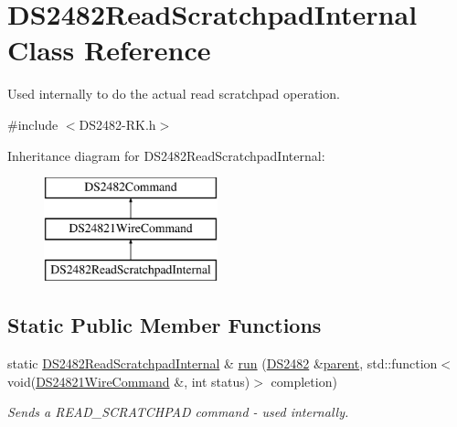 \hypertarget{class_d_s2482_read_scratchpad_internal}{}\section{D\+S2482\+Read\+Scratchpad\+Internal Class Reference}
\label{class_d_s2482_read_scratchpad_internal}


Used internally to do the actual read scratchpad operation.  




{\ttfamily \#include $<$D\+S2482-\/\+R\+K.\+h$>$}

Inheritance diagram for D\+S2482\+Read\+Scratchpad\+Internal\+:\begin{figure}[H]
\begin{center}
\leavevmode
\includegraphics[height=3.000000cm]{class_d_s2482_read_scratchpad_internal}
\end{center}
\end{figure}
\subsection*{Static Public Member Functions}
\begin{DoxyCompactItemize}
\item 
\mbox{\label{class_d_s2482_read_scratchpad_internal_a222c1ac367ecdbecb671c99796a4fa26}} 
static \mbox{\hyperlink{class_d_s2482_read_scratchpad_internal}{D\+S2482\+Read\+Scratchpad\+Internal}} \& \mbox{\hyperlink{class_d_s2482_read_scratchpad_internal_a222c1ac367ecdbecb671c99796a4fa26}{run}} (\mbox{\hyperlink{class_d_s2482}{D\+S2482}} \&\mbox{\hyperlink{class_d_s2482_command_a54a41fb8a610ef2077f5e5377771aaf3}{parent}}, std\+::function$<$ void(\mbox{\hyperlink{class_d_s24821_wire_command}{D\+S24821\+Wire\+Command}} \&, int status)$>$ completion)
\begin{DoxyCompactList}\small\item\em Sends a R\+E\+A\+D\+\_\+\+S\+C\+R\+A\+T\+C\+H\+P\+AD command -\/ used internally. \end{DoxyCompactList}\end{DoxyCompactItemize}
